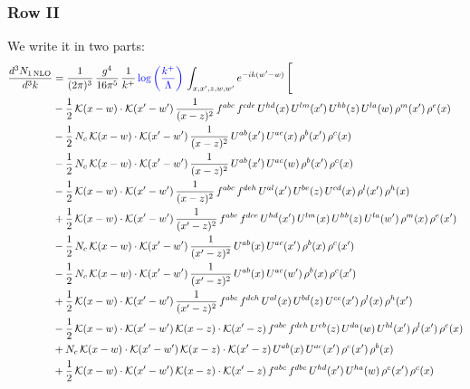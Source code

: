 \documentclass[9pt]{article}
\numberwithin{equation}{section}
\begin{document}
\subsubsection{Row II}
We write it in two parts:
\begin{align}
\frac{d^{3}N_{1\,\mathrm{NLO}}}{d^{3}k} & = \frac{1}{(2\pi)^{3}}\,\frac{g^{4}}{16\pi^{5}}\,\frac{1}{k^{+}}\,{\color{blue}\log{\left(\frac{k^{+}}{\Lambda}\right)}}\,\int_{x,x',z,w,w'}e^{-ik(w'-w)}\,\Bigg[\notag\\ & -\frac{1}{2}\,\mathcal{K}(x-w)\cdot\mathcal{K}(x'-w')\,\frac{1}{(x-z)^{2}}\,f^{abc}\,f^{cde}\,U^{hd}(x)\,U^{lm}(x')\,U^{hb}(z)\,U^{la}(w)\,\rho^{m}(x')\,\rho^{e}(x)\notag\\
& -\frac{1}{2}\,N_{c}\,\mathcal{K}(x-w)\cdot\mathcal{K}(x'-w')\,\frac{1}{(x-z)^{2}}\,U^{ab}(x')\,U^{ac}(x)\,\rho^{b}(x')\,\rho^{c}(x)\notag\\
& -\frac{1}{2}\,N_{c}\,\mathcal{K}(x-w)\cdot\mathcal{K}(x'-w')\,\frac{1}{(x-z)^{2}}\,U^{ab}(x')\,U^{ac}(w)\,\rho^{b}(x')\,\rho^{c}(x)\notag\\
& -\frac{1}{2}\,\mathcal{K}(x-w)\cdot\mathcal{K}(x'-w')\,\frac{1}{(x-z)^{2}}\,f^{abc}\,f^{deh}\,U^{al}(x')\,U^{be}(z)\,U^{cd}(x)\,\rho^{l}(x')\,\rho^{h}(x)\notag\\
& +\frac{1}{2}\,\mathcal{K}(x-w)\cdot\mathcal{K}(x'-w')\,\frac{1}{(x'-z)^{2}}\,f^{abc}\,f^{dce}\,U^{hd}(x')\,U^{lm}(x)\,U^{hb}(z)\,U^{la}(w')\,\rho^{m}(x)\,\rho^{e}(x')\notag\\
& -\frac{1}{2}\,N_{c}\,\mathcal{K}(x-w)\cdot\mathcal{K}(x'-w')\,\frac{1}{(x'-z)^{2}}\,U^{ab}(x)\,U^{ac}(x')\,\rho^{b}(x)\,\rho^{c}(x')\notag\\
& -\frac{1}{2}\,N_{c}\,\mathcal{K}(x-w)\cdot\mathcal{K}(x'-w')\,\frac{1}{(x'-z)^{2}}\,U^{ab}(x)\,U^{ac}(w')\,\rho^{b}(x)\,\rho^{c}(x')\notag\\
& +\frac{1}{2}\,\mathcal{K}(x-w)\cdot\mathcal{K}(x'-w')\,\frac{1}{(x'-z)^{2}}\,f^{abc}\,f^{deh}\,U^{al}(x)\,U^{bd}(z)\,U^{ce}(x')\,\rho^{l}(x)\,\rho^{h}(x')\notag\\
& -\frac{1}{2}\,\mathcal{K}(x-w)\cdot\mathcal{K}(x'-w')\,\mathcal{K}(x-z)\cdot\mathcal{K}(x'-z)\,f^{abc}\,f^{deh}\,U^{eb}(z)\,U^{da}(w)\,U^{hl}(x')\,\rho^{l}(x')\,\rho^{c}(x)\notag\\
& +N_{c}\,\mathcal{K}(x-w)\cdot\mathcal{K}(x'-w')\,\mathcal{K}(x-z)\cdot\mathcal{K}(x'-z)\,U^{ab}(x)\,U^{ac}(x')\,\rho^{c}(x')\,\rho^{b}(x)\notag\\
& +\frac{1}{2}\,\mathcal{K}(x-w)\cdot\mathcal{K}(x'-w')\,\mathcal{K}(x-z)\cdot\mathcal{K}(x'-z)\,f^{abc}\,f^{dbe}\,U^{hd}(x')\,U^{ha}(w)\,\rho^{e}(x')\,\rho^{c}(x)\notag\\

\end{align}
\end{document}
